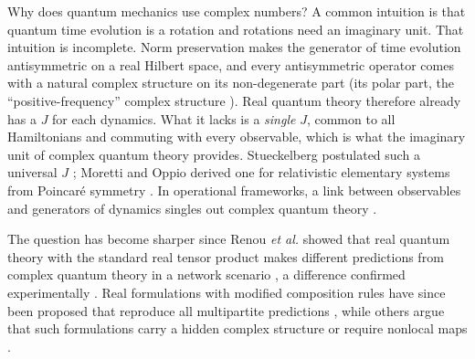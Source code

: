 \documentclass[11pt]{article}
\theoremstyle{remark}
\begin{document}
Why does quantum mechanics use complex numbers? A common intuition is that quantum time evolution is a rotation and rotations need an imaginary unit. That intuition is incomplete. Norm preservation makes the generator of time evolution antisymmetric on a real Hilbert space, and every antisymmetric operator comes with a natural complex structure on its non-degenerate part (its polar part, the ``positive-frequency'' complex structure \cite{AshtekarMagnon,Aste,Vaughan}). Real quantum theory therefore already has a $J$ for each dynamics. What it lacks is a \emph{single} $J$, common to all Hamiltonians and commuting with every observable, which is what the imaginary unit of complex quantum theory provides. Stueckelberg postulated such a universal $J$ \cite{Stueckelberg}; Moretti and Oppio derived one for relativistic elementary systems from Poincar\'e symmetry \cite{MorettiOppio}. In operational frameworks, a link between observables and generators of dynamics singles out complex quantum theory \cite{AlfsenShultz,BMU}.

The question has become sharper since Renou \emph{et al.} showed that real quantum theory with the standard real tensor product makes different predictions from complex quantum theory in a network scenario \cite{Renou}, a difference confirmed experimentally \cite{Chen,Li}. Real formulations with modified composition rules have since been proposed that reproduce all multipartite predictions \cite{HoffreumonWoods,BarriosHita,MaioliCuradoGazeau}, while others argue that such formulations carry a hidden complex structure \cite{BangChoBaek} or require nonlocal maps \cite{FengRenVedral}.
\end{document}
